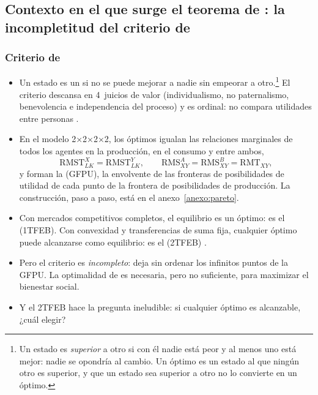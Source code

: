\documentclass[11pt]{article}
\begin{document}
\subsection{Contexto en el que surge el teorema de :\cortetitulo{} la incompletitud del criterio de }\label{sec:contexto-pareto}

\subsubsection{Criterio de }\label{sec:pareto}

\begin{itemize}
\item Un estado es un  si no se puede mejorar a nadie sin empeorar a otro.\footnote{Un estado es \emph{ superior} a otro si con él nadie está peor y al menos uno está mejor: nadie se opondría al cambio. Un óptimo es un estado al que ningún otro es  superior, y que un estado sea  superior a otro no lo convierte en un óptimo.} El criterio descansa en 4~juicios de valor (individualismo, no paternalismo, benevolencia e independencia del proceso) y es ordinal: no compara utilidades entre personas .
\item En el modelo 2×2×2×2, los óptimos igualan las relaciones marginales de todos los agentes en la producción, en el consumo y entre ambos,
  \begin{equation}\label{eq:condiciones-pareto}
  \mathrm{RMST}^X_{LK}=\mathrm{RMST}^Y_{LK},\qquad \mathrm{RMS}^A_{XY}=\mathrm{RMS}^B_{XY}=\mathrm{RMT}_{XY},
  \end{equation}
  y forman la  (GFPU), la envolvente de las fronteras de posibilidades de utilidad de cada punto de la frontera de posibilidades de producción. La construcción, paso a paso, está en el anexo~\ref{anexo:pareto}.
\item Con mercados competitivos completos, el equilibrio es un óptimo: es el  (1TFEB). Con convexidad y transferencias de suma fija, cualquier óptimo puede alcanzarse como equilibrio: es el  (2TFEB) .
\item Pero el criterio es \emph{incompleto}: deja sin ordenar los infinitos puntos de la GFPU. La optimalidad de  es necesaria, pero no suficiente, para maximizar el bienestar social.
\item Y el 2TFEB hace la pregunta ineludible: si cualquier óptimo es alcanzable, ¿cuál elegir?
\end{itemize}
\end{document}
